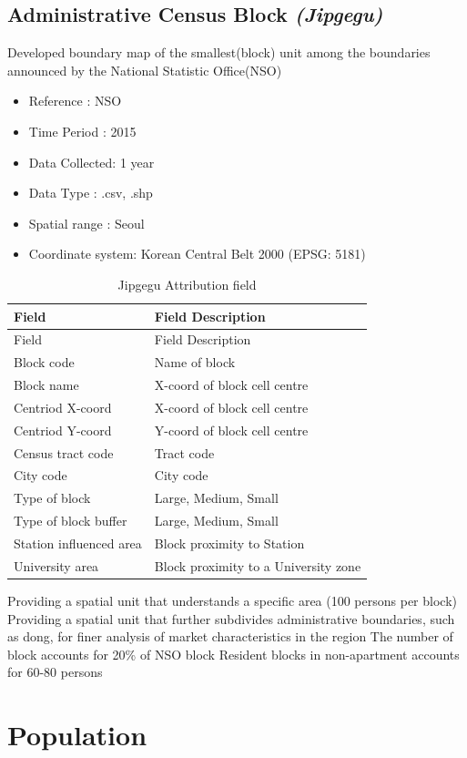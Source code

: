 \documentclass[]{book}
\providecommand{\tightlist}{%
  \setlength{\itemsep}{0pt}\setlength{\parskip}{0pt}}
\begin{document}
\section{\texorpdfstring{Administrative Census Block
\emph{(Jipgegu)}}{Administrative Census Block (Jipgegu)}}\label{administrative-census-block-jipgegu}

Developed boundary map of the smallest(block) unit among the boundaries
announced by the National Statistic Office(NSO)

\begin{itemize}
\tightlist
\item
  Reference : NSO
\item
  Time Period : 2015
\item
  Data Collected: 1 year
\item
  Data Type : .csv, .shp
\item
  Spatial range : Seoul
\item
  Coordinate system: Korean Central Belt 2000 (EPSG: 5181)
\end{itemize}

\begin{longtable}[]{@{}ll@{}}
\caption{\label{tab:foo} Jipgegu Attribution field}\tabularnewline
\toprule
Field & Field Description\tabularnewline
\midrule
\endfirsthead
\toprule
Field & Field Description\tabularnewline
\midrule
\endhead
Block code & Name of block\tabularnewline
Block name & X-coord of block cell centre\tabularnewline
Centriod X-coord & X-coord of block cell centre\tabularnewline
Centriod Y-coord & Y-coord of block cell centre\tabularnewline
Census tract code & Tract code\tabularnewline
City code & City code\tabularnewline
Type of block & Large, Medium, Small\tabularnewline
Type of block buffer & Large, Medium, Small\tabularnewline
Station influenced area & Block proximity to Station\tabularnewline
University area & Block proximity to a University zone\tabularnewline
\bottomrule
\end{longtable}

Providing a spatial unit that understands a specific area (100 persons
per block) Providing a spatial unit that further subdivides
administrative boundaries, such as dong, for finer analysis of market
characteristics in the region The number of block accounts for 20\% of
NSO block Resident blocks in non-apartment accounts for 60-80 persons

\chapter{Population}\label{population}
\end{document}
